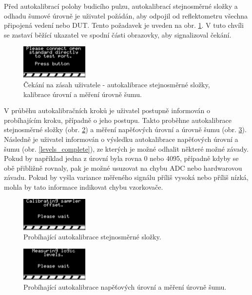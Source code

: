 Před autokalibrací polohy budicího pulzu, autokalibrací stejnosměrné složky a odhadu šumové úrovně je uživatel požádán, aby odpojil od reflektometru všechna připojená vedení nebo DUT. Tento požadavek je uveden na obr. \ref{offset_user_wait}. V tuto chvíli se zastaví běžící ukazatel ve spodní části obrazovky, aby signalizoval čekání.
\begin{figure}[H]
\includegraphics[width=0.3\textwidth,keepaspectratio,interpolate=false]{images/offset_user_wait.png}\caption{Čekání na zásah uživatele - autokalibrace stejnosměrné složky, kalibrace úrovní a měření úrovně šumu.}\label{offset_user_wait}
\end{figure}

V průběhu autokalibračních kroků je uživatel postupně informován o probíhajícím kroku, případně o jeho postupu. Takto proběhne autokalibrace stejnosměrné složky (obr. \ref{offset_wait}) a měření napěťových úrovní a úrovně šumu (obr. \ref{levels_user_wait}). Následně je uživatel informován o výsledku autokalibrace napěťových úrovní a šumu (obr. \ref{levels_complete}), ze kterých je možné odhalit některé možné závady. Pokud by například jedna z úrovní byla rovna 0 nebo 4095, případně kdyby se obě přibližně rovnaly, pak je možné usuzovat na chybu ADC nebo hardwarovou závadu. Pokud by vyšla variance měřeného signálu příliš vysoká nebo příliš nízká, mohla by tato informace indikovat chybu vzorkovače.
\begin{figure}[H]
\includegraphics[width=0.3\textwidth,keepaspectratio,interpolate=false]{images/offset_wait.png}\caption{Probíhající autokalibrace stejnosměrné složky.}\label{offset_wait}
\end{figure}

\begin{figure}[H]
\includegraphics[width=0.3\textwidth,keepaspectratio,interpolate=false]{images/levels_user_wait.png}\caption{Probíhající autokalibrace napěťových úrovní a měření úrovně šumu.}\label{levels_user_wait}
\end{figure}

